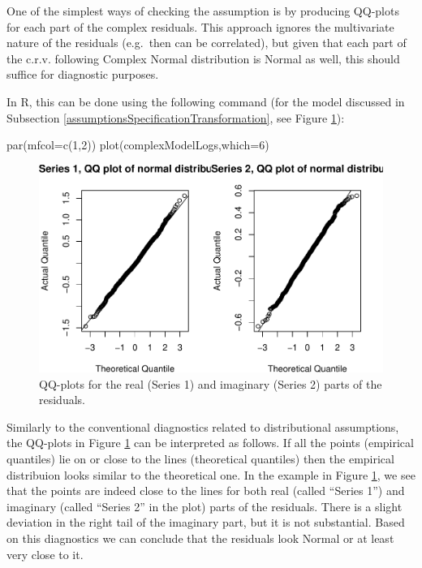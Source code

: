 \documentclass[
]{book}
\newenvironment{Shaded}{\begin{snugshade}}{\end{snugshade}}
\newcommand{\AttributeTok}[1]{\textcolor[rgb]{0.77,0.63,0.00}{#1}}
\newcommand{\DecValTok}[1]{\textcolor[rgb]{0.00,0.00,0.81}{#1}}
\newcommand{\FunctionTok}[1]{\textcolor[rgb]{0.00,0.00,0.00}{#1}}
\newcommand{\NormalTok}[1]{#1}
\begin{document}
One of the simplest ways of checking the assumption is by producing QQ-plots for each part of the complex residuals. This approach ignores the multivariate nature of the residuals (e.g.~then can be correlated), but given that each part of the c.r.v. following Complex Normal distribution is Normal as well, this should suffice for diagnostic purposes.

In R, this can be done using the following command (for the model discussed in Subsection \ref{assumptionsSpecificationTransformation}, see Figure \ref{fig:complexNormDiagnostics}):

\begin{Shaded}
\begin{Highlighting}[]
\FunctionTok{par}\NormalTok{(}\AttributeTok{mfcol=}\FunctionTok{c}\NormalTok{(}\DecValTok{1}\NormalTok{,}\DecValTok{2}\NormalTok{))}
\FunctionTok{plot}\NormalTok{(complexModelLogs,}\AttributeTok{which=}\DecValTok{6}\NormalTok{)}
\end{Highlighting}
\end{Shaded}

\begin{figure}
\centering
\includegraphics{Svetunkov---Svetunkov---Complex-Valued-Econometrics_files/figure-latex/complexNormDiagnostics-1.pdf}
\caption{\label{fig:complexNormDiagnostics}QQ-plots for the real (Series 1) and imaginary (Series 2) parts of the residuals.}
\end{figure}

Similarly to the conventional diagnostics related to distributional assumptions, the QQ-plots in Figure \ref{fig:complexNormDiagnostics} can be interpreted as follows. If all the points (empirical quantiles) lie on or close to the lines (theoretical quantiles) then the empirical distribuion looks similar to the theoretical one. In the example in Figure \ref{fig:complexNormDiagnostics}, we see that the points are indeed close to the lines for both real (called ``Series 1'') and imaginary (called ``Series 2'' in the plot) parts of the residuals. There is a slight deviation in the right tail of the imaginary part, but it is not substantial. Based on this diagnostics we can conclude that the residuals look Normal or at least very close to it.
\end{document}
